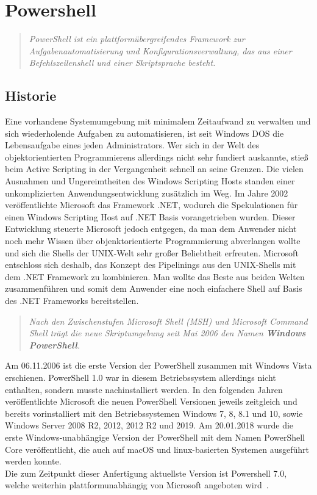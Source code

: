 \chapter{Powershell}\label{PowerShell}
\begin{quote}\textit{\glqq PowerShell ist ein plattform{\"u}bergreifendes Framework zur Aufgabenautomatisierung und Konfigurationsverwaltung, das aus einer Befehlszeilenshell und einer Skriptsprache besteht.\grqq{}}~\cite[S. 1]{Microsoft2021}\end{quote}\vspace{-3mm}
\section{Historie}
Eine vorhandene Systemumgebung mit minimalem Zeitaufwand zu verwalten und sich wiederholende Aufgaben zu automatisieren, ist seit Windows DOS die Lebensaufgabe eines jeden Administrators. Wer sich in der Welt des objektorientierten Programmierens allerdings nicht sehr fundiert auskannte, stieß beim Active Scripting in der Vergangenheit schnell an seine Grenzen. Die vielen Ausnahmen und Ungereimtheiten des Windows Scripting Hosts standen einer unkomplizierten Anwendungsentwicklung zusätzlich im Weg. Im Jahre 2002 veröffentlichte Microsoft das Framework .NET, wodurch die Spekulationen für einen Windows Scripting Host auf .NET Basis vorangetrieben wurden. 
Dieser Entwicklung steuerte Microsoft jedoch entgegen, da man dem Anwender nicht noch mehr Wissen über objenktorientierte Programmierung abverlangen wollte und sich die Shells der UNIX-Welt sehr großer Beliebtheit erfreuten. Microsoft entschloss sich deshalb, das Konzept des Pipelinings aus den UNIX-Shells mit dem .NET Framework zu kombinieren. Man wollte das Beste aus beiden Welten zusammenführen und somit dem Anwender eine noch einfachere Shell auf Basis des .NET Frameworks bereitstellen.
\cite[S.~23]{HolgerSchwichtenberg2018}\vspace{-3mm}
\begin{quote}\textit{\glqq Nach den Zwischenstufen {\glqq}Microsoft Shell (MSH){\grqq} und {\glqq}Microsoft Command Shell{\grqq} tr{\"a}gt die neue Skriptumgebung seit Mai 2006 den Namen {\glqq}\textbf{Windows PowerShell}{\grqq}.\grqq{}}~\cite[S.~23]{HolgerSchwichtenberg2018}\end{quote}
Am 06.11.2006 ist die erste Version der PowerShell zusammen mit Windows Vista erschienen. PowerShell 1.0 war in diesem Betriebssystem allerdings nicht enthalten, sondern musste nachinstalliert werden. In den folgenden Jahren veröffentlichte Microsoft die neuen PowerShell Versionen jeweils zeitgleich und bereits vorinstalliert mit den Betriebssystemen Windows 7, 8, 8.1 und 10, sowie Windows Server 2008 R2, 2012, 2012 R2 und 2019. Am 20.01.2018 wurde die erste Windows-unabhängige Version der PowerShell mit dem Namen PowerShell Core veröffentlicht, die auch auf macOS und linux-basierten Systemen ausgeführt werden konnte. \cite[S.~23 ff.]{HolgerSchwichtenberg2018}\medskip\\
Die zum Zeitpunkt dieser Anfertigung aktuellste Version ist Powershell 7.0, welche weiterhin plattformunabhängig von Microsoft angeboten wird~\cite{JoeyAiello032020}.


